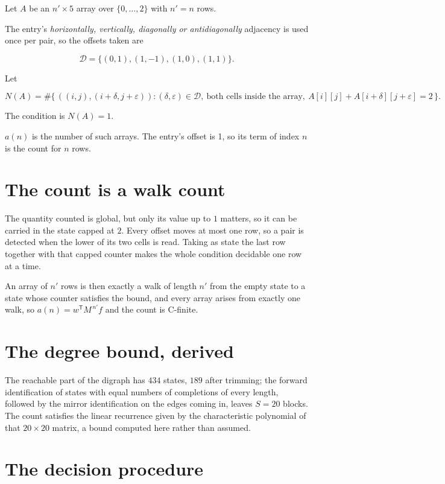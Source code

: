 \documentclass[11pt]{article}
\theoremstyle{definition}
\begin{document}
Let $A$ be an $n' \times 5$ array over $\{0,\dots,2\}$ with $n' = n$ rows.

The entry's {\itshape horizontally, vertically, diagonally or antidiagonally} adjacency is used once per pair, so the offsets taken are

\[\mathcal{D} = \{(0,1), (1,-1), (1,0), (1,1)\}.\]

Let

\[N(A) = \#\bigl\{\,((i,j),(i{+}\delta,j{+}\varepsilon)) : (\delta,\varepsilon) \in \mathcal{D},\ \text{both cells inside the array},\ A[i][j] + A[i{+}\delta][j{+}\varepsilon] = 2\,\bigr\}.\]

The condition is $N(A) = 1$.

$a(n)$ is the number of such arrays. The entry's offset is 1, so its term of index $n$ is the count for $n$ rows.

\section{The count is a walk count}

The quantity counted is global, but only its value up to $1$ matters, so it can be carried in the state capped at $2$. Every offset moves at most one row, so a pair is detected when the lower of its two cells is read. Taking as state the last row together with that capped counter makes the whole condition decidable one row at a time.

An array of $n'$ rows is then exactly a walk of length $n'$ from the empty state to a state whose counter satisfies the bound, and every array arises from exactly one walk, so $a(n) = w^{\mathsf T}M^{\,n'}f$ and the count is C-finite.

\section{The degree bound, derived}

The reachable part of the digraph has $434$ states, $189$ after trimming; the forward identification of states with equal numbers of completions of every length, followed by the mirror identification on the edges coming in, leaves $S = 20$ blocks. The count satisfies the linear recurrence given by the characteristic polynomial of that $20\times20$ matrix, a bound computed here rather than assumed.

\section{The decision procedure}
\end{document}
